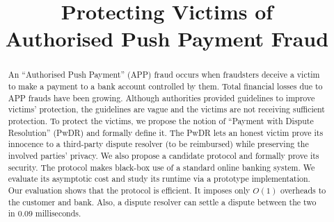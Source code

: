 \documentclass[orivec]{llncs}
\begin{document}
\title{Protecting Victims of \\ Authorised Push Payment Fraud}
\author{}
\institute{}

\date{}
\maketitle{}


\begin{abstract}
An ``Authorised Push Payment'' (APP) fraud occurs when fraudsters deceive a victim  to make  a payment  to a bank account controlled by them.  Total financial losses due to  APP frauds have been  growing. Although  authorities   provided guidelines to  improve victims’ protection, the guidelines are  vague and  the victims are not receiving sufficient protection. To protect the  victims,  we propose the notion of ``Payment with Dispute Resolution'' (PwDR) and formally define it. The PwDR lets an honest victim  prove its innocence to a third-party dispute resolver  (to be reimbursed) while preserving the involved parties' privacy. We also propose a  candidate protocol  and formally prove its security. The protocol  makes black-box use of a standard online banking system. We evaluate its    asymptotic cost and study its runtime  via a prototype implementation. Our evaluation shows that the protocol is  efficient. It imposes only $O(1)$ overheads to the customer and bank.  Also, a dispute resolver can  settle a dispute between the two  in $0.09$ milliseconds.


\end{abstract}







\appendix





\end{document}
